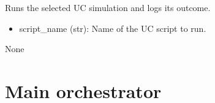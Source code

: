 \documentclass[letterpaper,10pt,english]{sphinxmanual}
\begin{document}

\begin{fulllineitems}
\label{\detokenize{running_network:running_network.run_simulation}}
\pysigstartsignatures
{}
\pysigstopsignatures
\sphinxAtStartPar
Runs the selected UC simulation and logs its outcome.
\begin{description}
\begin{itemize}
\item {} 
\sphinxAtStartPar
script\_name (str): Name of the UC script to run.

\end{itemize}

\sphinxAtStartPar
None

\end{description}

\end{fulllineitems}


\sphinxstepscope


\chapter{Main orchestrator}
\label{\detokenize{network_watcher:module-network_watcher}}\label{\detokenize{network_watcher:main-orchestrator}}\label{\detokenize{network_watcher::doc}}
\end{document}
